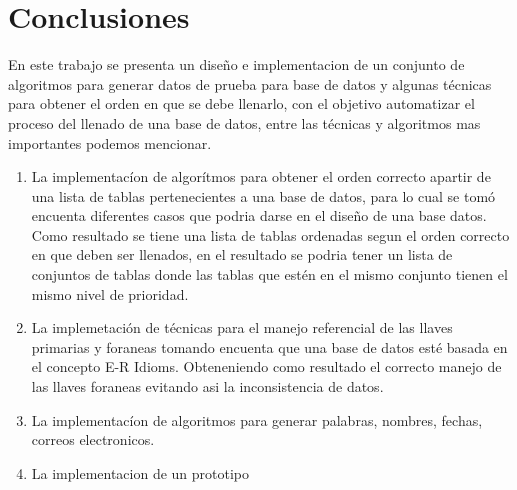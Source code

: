 \chapter{Conclusiones}
En este trabajo se presenta un dise\~no e implementacion de un conjunto de algoritmos para generar datos de prueba para base de datos y algunas t\'ecnicas para obtener el orden en que se debe llenarlo, con el objetivo automatizar el proceso del llenado de una base de datos, entre las t\'ecnicas y algoritmos mas importantes podemos mencionar.

\begin{enumerate}
\item La implementac\'ion de algor\'itmos para obtener el orden correcto apartir de una lista de tablas pertenecientes a una base de datos, para lo cual se tom\'o encuenta diferentes casos que podria darse en el dise\~no de una base datos. Como resultado se tiene una lista de tablas ordenadas segun el orden correcto en que deben ser llenados, en el resultado se podria tener un lista de conjuntos de tablas donde las tablas que est\'en en el mismo conjunto tienen el mismo nivel de prioridad.
\item La implemetaci\'on de t\'ecnicas para el manejo referencial de las llaves primarias y foraneas tomando encuenta que una base de datos est\'e  basada en el concepto E-R Idioms. Obteneniendo como resultado el correcto manejo de las llaves foraneas evitando asi la inconsistencia de datos.
\item La implementac\'ion de algoritmos para generar palabras, nombres, fechas, correos electronicos.
\item La implementacion de un prototipo   
\end{enumerate}